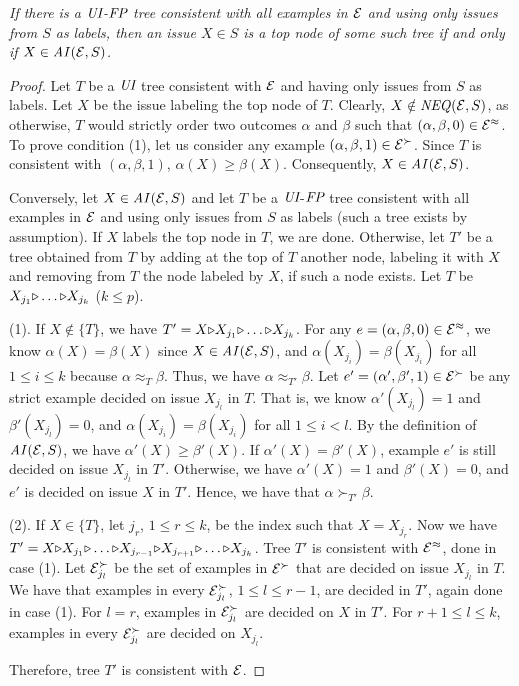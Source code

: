 \begin{prop}
\label{prop:1}
{\it If there is a $\textit{UI}$-$\textit{FP}$ tree consistent with all examples in $\mathcal{E}$ and 
using only issues from $S$ as labels, then an issue $X\in S$ is a top node
of some such tree if and only if $X\in \mathit{AI}(\mathcal{E},S)$.}
\end{prop}
\begin{proof}
Let $T$ be a $\textit{UI}$ tree consistent with $\mathcal{E}$ and having only issues from 
$S$ as labels. Let $X$ be the issue labeling the top node of $T$. Clearly,
$X\notin \mathit{NEQ}(\mathcal{E},S)$, as otherwise, $T$ would strictly order two outcomes
$\alpha$ and $\beta$ such that $(\alpha,\beta,0)\in \mathcal{E}^\approx$. To prove
condition (1), let us consider any example $(\alpha,\beta,1)\in \mathcal{E}^\succ$. 
Since $T$ is consistent with $(\alpha,\beta,1)$, $\alpha(X)\geq\beta(X)$. 
Consequently, $X\in \mathit{AI}(\mathcal{E},S)$.

Conversely, let $X\in \mathit{AI}(\mathcal{E},S)$ and let $T$ be a $\textit{UI}$-$\textit{FP}$ tree 
consistent with all examples in $\mathcal{E}$ and using only issues from $S$ as 
labels (such a tree exists by assumption). If $X$ labels the top node in 
$T$, we are done. Otherwise, let $T'$ be a tree obtained from $T$ by 
adding at the top of $T$ another node, labeling it with $X$ and removing
from $T$ the node labeled by $X$, if such a node exists. 
Let $T$ be $X_{j_1} \mathit{\triangleright} \ldots \mathit{\triangleright} X_{j_k}$ ($k \leq p$).

\noindent (1). If $X \not \in \{T\}$, we have $T'=X \mathit{\triangleright} X_{j_1} \mathit{\triangleright} \ldots \mathit{\triangleright} X_{j_k}$.
For any $e=(\alpha,\beta,0) \in \mathcal{E}^\approx$, we know $\alpha(X)=\beta(X)$ since
$X\in \mathit{AI}(\mathcal{E},S)$, and $\alpha(X_{j_i})=\beta(X_{j_i})$ for all
$1 \leq i \leq k$ because $\alpha \approx_T \beta$.
Thus, we have $\alpha \approx_{T'} \beta$.
Let $e'=(\alpha',\beta',1) \in \mathcal{E}^\succ$ be any strict example 
decided on issue $X_{j_l}$ in $T$.
That is, we know $\alpha'(X_{j_l})=1$ and $\beta'(X_{j_l})=0$, and
$\alpha(X_{j_i})=\beta(X_{j_i})$ for all $1 \leq i < l$.
By the definition of $\mathit{AI}(\mathcal{E},S)$, we have $\alpha'(X) \geq \beta'(X)$.
If $\alpha'(X) = \beta'(X)$, example $e'$ is still decided on issue $X_{j_l}$ in $T'$.
Otherwise, we have $\alpha'(X)=1$ and $\beta'(X)=0$, and $e'$ is decided on
issue $X$ in $T'$. Hence, we have that $\alpha \succ_{T'} \beta$.

\noindent (2). If $X \in \{T\}$, let $j_r$, $1\leq r\leq k$, be the index such that $X=X_{j_r}$.
Now we have $T'=X \mathit{\triangleright} X_{j_1} \mathit{\triangleright} \ldots \mathit{\triangleright} X_{j_{r-1}} \mathit{\triangleright} X_{j_{r+1}} \mathit{\triangleright} \ldots \mathit{\triangleright} X_{j_k}$.
Tree $T'$ is consistent with $\mathcal{E}^\approx$, done in case (1).
Let $\mathcal{E}^\succ_{j_l}$ be the set of examples in $\mathcal{E}^\succ$ that are
decided on issue $X_{j_l}$ in $T$.
We have that examples in every $\mathcal{E}^\succ_{j_l}$, $1\leq l \leq r-1$, are decided in $T'$,
again done in case (1).
For $l=r$, examples in $\mathcal{E}^\succ_{j_l}$ are decided on $X$ in $T'$.
For $r+1\leq l\leq k$, examples in every $\mathcal{E}^\succ_{j_l}$ are decided on $X_{j_l}$.

Therefore, tree $T'$ is consistent with $\mathcal{E}$.
\end{proof}

